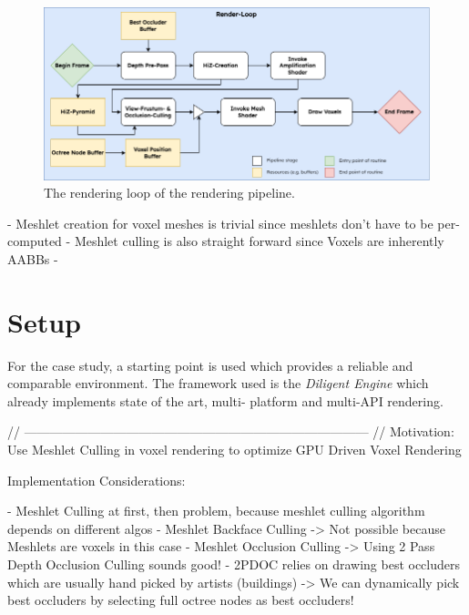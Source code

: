 \begin{figure}[h]
    \centering
    \includegraphics[width=\linewidth]{images/graphics/render-loop.png}
    \caption{The rendering loop of the rendering pipeline. }
    \label{fig:pipeline-loop}
\end{figure}



- Meshlet creation for voxel meshes is trivial since meshlets don't have to be per-computed
- Meshlet culling is also straight forward since Voxels are inherently AABBs
- 

\section{Setup}

For the case study, a starting point is used which provides a reliable and comparable environment.
The framework used is the \emph{Diligent Engine} which already implements state of the art, multi-
platform and multi-API rendering. \\

\noindent



// --------------------------------------------------------------------------------- //
Motivation:
Use Meshlet Culling in voxel rendering to optimize GPU Driven Voxel Rendering


Implementation Considerations:

- Meshlet Culling at first, then problem, because meshlet culling algorithm depends on different algos
    - Meshlet Backface Culling -> Not possible because Meshlets are voxels in this case
    - Meshlet Occlusion Culling -> Using 2 Pass Depth Occlusion Culling sounds good!
    - 2PDOC relies on drawing best occluders which are usually hand picked by artists (buildings)
        -> We can dynamically pick best occluders by selecting full octree nodes as best occluders!

